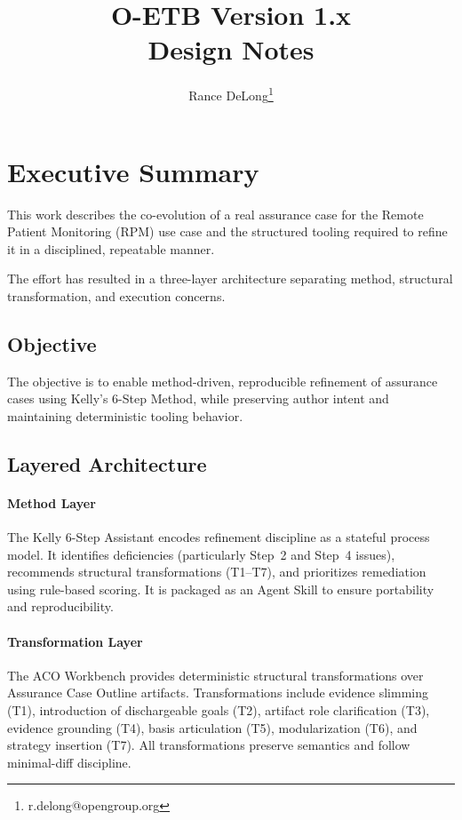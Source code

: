 \documentclass[12pt,twoside,a4paper]{article}
\title{O-ETB Version 1.x\\Design Notes}
\author{Rance DeLong\thanks{r.delong@opengroup.org}}
\affil{The Open Group}
\date{\eudate}
\begin{document}
\thispagestyle{empty}

\maketitle
{}
\tableofcontents
{}
\listoffigures

\clearpage

\section*{Executive Summary}

This work describes the co-evolution of a real assurance case for the Remote Patient Monitoring (RPM) use case and the structured tooling required to refine it in a disciplined, repeatable manner.

The effort has resulted in a three-layer architecture separating method, structural transformation, and execution concerns.

\subsection*{Objective}

The objective is to enable method-driven, reproducible refinement of assurance cases using Kelly’s 6-Step Method, while preserving author intent and maintaining deterministic tooling behavior.

\subsection*{Layered Architecture}

\paragraph{Method Layer}
The Kelly 6-Step Assistant encodes refinement discipline as a stateful process model. It identifies deficiencies (particularly Step~2 and Step~4 issues), recommends structural transformations (T1--T7), and prioritizes remediation using rule-based scoring. It is packaged as an Agent Skill to ensure portability and reproducibility.

\paragraph{Transformation Layer}
The ACO Workbench provides deterministic structural transformations over Assurance Case Outline artifacts. Transformations include evidence slimming (T1), introduction of dischargeable goals (T2), artifact role clarification (T3), evidence grounding (T4), basis articulation (T5), modularization (T6), and strategy insertion (T7). All transformations preserve semantics and follow minimal-diff discipline.
\end{document}

